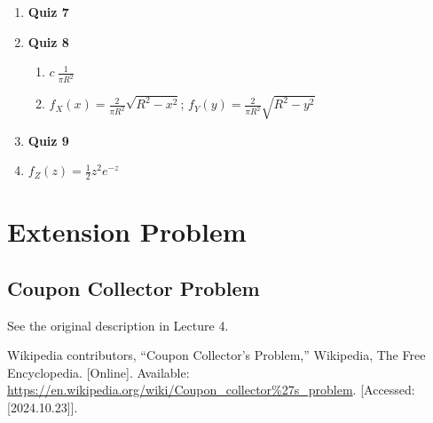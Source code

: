 \documentclass{article}
\begin{document}
\begin{enumerate}
\item \textbf{\large Quiz 7}


\item \textbf{\large Quiz 8}
\begin{enumerate}
    \item $c \ \frac{1}{\pi R^2}$
    \item $f_X(x) = \frac{2}{\pi R^2}\sqrt{R^2 - x^2}$;  $f_Y(y) = \frac{2}{\pi R^2}\sqrt{R^2 - y^2}$
\end{enumerate}

\item \textbf{\large Quiz 9}
    \item $f_Z(z) = \frac{1}{2}z^2e^{-z}$
\end{enumerate}


\newpage

\section{Extension Problem}
\subsection{Coupon Collector Problem}
See the original description in Lecture 4.




\newpage




\begin{thebibliography}{1}

Wikipedia contributors, ``Coupon Collector's Problem,'' Wikipedia, The Free Encyclopedia. [Online]. Available: \url{https://en.wikipedia.org/wiki/Coupon_collector%27s_problem}. [Accessed: [2024.10.23]].

\end{thebibliography}
\end{document}
